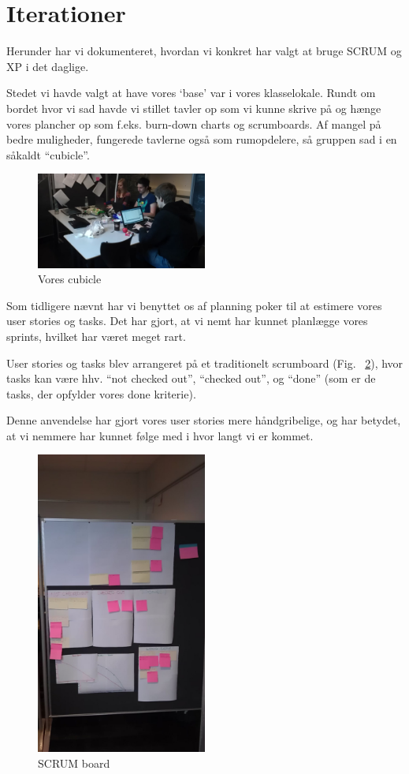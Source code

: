 \documentclass[12pt, a4paper]{report}
\begin{document}
\section{Iterationer}

Herunder har vi dokumenteret, hvordan vi konkret har valgt at bruge SCRUM og XP i det daglige.

Stedet vi havde valgt at have vores ‘base’ var i vores klasselokale. Rundt om bordet hvor vi sad havde vi stillet tavler op som vi kunne skrive på og hænge vores plancher op som f.eks. burn-down charts og scrumboards. Af mangel på bedre muligheder, fungerede tavlerne også som rumopdelere, så gruppen sad i en såkaldt “cubicle”.

\begin{figure}
\includegraphics[width=0.5\textwidth]{ziriuzarbejde}
\caption{Vores cubicle}
\label{cubicle}
\end{figure}

Som tidligere nævnt har vi benyttet os af planning poker til at estimere vores user stories og tasks. Det har gjort, at vi nemt har kunnet planlægge vores sprints, hvilket har været meget rart.

User stories og tasks blev arrangeret på et traditionelt scrumboard (Fig. ~\ref{s_board}), hvor tasks kan være hhv. “not checked out”, “checked out”, og “done” (som er de tasks, der opfylder vores done kriterie).

Denne anvendelse har gjort vores user stories mere håndgribelige, og har betydet, at vi nemmere har kunnet følge med i hvor langt vi er kommet.

\begin{figure}
\includegraphics[width=0.5\textwidth]{scrumboard}
\caption{SCRUM board}
\label{s_board}
\end{figure}
\end{document}
